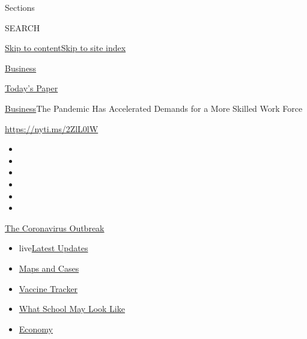 Sections

SEARCH

\protect\hyperlink{site-content}{Skip to
content}\protect\hyperlink{site-index}{Skip to site index}

\href{https://www.nytimes.com/section/business}{Business}

\href{https://myaccount.nytimes.com/auth/login?response_type=cookie\&client_id=vi}{}

\href{https://www.nytimes.com/section/todayspaper}{Today's Paper}

\href{/section/business}{Business}\textbar{}The Pandemic Has Accelerated
Demands for a More Skilled Work Force

\url{https://nyti.ms/2ZlL0lW}

\begin{itemize}
\item
\item
\item
\item
\item
\item
\end{itemize}

\href{https://www.nytimes.com/news-event/coronavirus?action=click\&pgtype=Article\&state=default\&region=TOP_BANNER\&context=storylines_menu}{The
Coronavirus Outbreak}

\begin{itemize}
\tightlist
\item
  live\href{https://www.nytimes.com/2020/08/01/world/coronavirus-covid-19.html?action=click\&pgtype=Article\&state=default\&region=TOP_BANNER\&context=storylines_menu}{Latest
  Updates}
\item
  \href{https://www.nytimes.com/interactive/2020/us/coronavirus-us-cases.html?action=click\&pgtype=Article\&state=default\&region=TOP_BANNER\&context=storylines_menu}{Maps
  and Cases}
\item
  \href{https://www.nytimes.com/interactive/2020/science/coronavirus-vaccine-tracker.html?action=click\&pgtype=Article\&state=default\&region=TOP_BANNER\&context=storylines_menu}{Vaccine
  Tracker}
\item
  \href{https://www.nytimes.com/interactive/2020/07/29/us/schools-reopening-coronavirus.html?action=click\&pgtype=Article\&state=default\&region=TOP_BANNER\&context=storylines_menu}{What
  School May Look Like}
\item
  \href{https://www.nytimes.com/live/2020/07/31/business/stock-market-today-coronavirus?action=click\&pgtype=Article\&state=default\&region=TOP_BANNER\&context=storylines_menu}{Economy}
\end{itemize}

